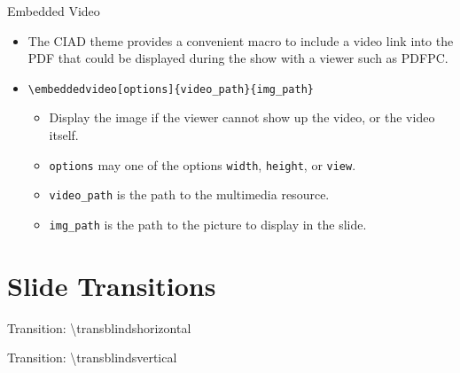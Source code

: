 \documentclass[english,sectioncirclenumberstyle]{ciadbeamer}
\begin{document}
\begin{frame}{Embedded Video}
	\begin{itemize}
	\item The CIAD theme provides a convenient macro to include a video link into the PDF that could be displayed during the show with a viewer such as PDFPC.
	\item \texttt{{\textbackslash}embeddedvideo[options]\{video\_path\}\{img\_path\}}
		\begin{itemize}
		\item Display the image if the viewer cannot show up the video, or the video itself.
		\item \texttt{options} may one of the options \texttt{width}, \texttt{height}, or \texttt{view}.
		\item \texttt{video\_path} is the path to the multimedia resource.
		\item \texttt{img\_path} is the path to the picture to display in the slide.
		\end{itemize}
	\end{itemize}
\end{frame}

\section{Slide Transitions}
\sectiontableofcontentslide


\begin{frame}[c]{Transition: {\textbackslash}transblindshorizontal}
	\transblindshorizontal
	\begin{center}
	\end{center}
\end{frame}

\begin{frame}[c]{Transition: {\textbackslash}transblindsvertical}
	\transblindsvertical
	\begin{center}
	\end{center}
\end{frame}
\end{document}
